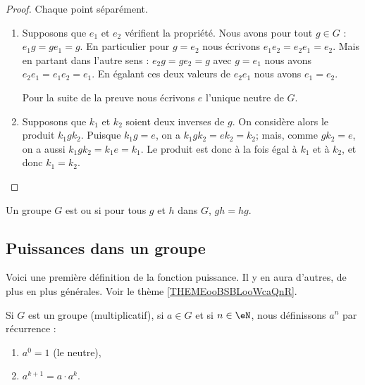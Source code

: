\begin{proof}
    Chaque point séparément.
    \begin{enumerate}
        \item
            Supposons que \( e_1\) et \( e_2\) vérifient la propriété. Nous avons pour tout \( g\in G\) : \( e_1g=ge_1=g\). En particulier pour \( g=e_2\) nous écrivons \( e_1e_2=e_2e_1=e_2\). Mais en partant dans l'autre sens : \( e_2g=ge_2=g\) avec \( g=e_1\) nous avons \( e_2e_1=e_1e_2=e_1\). En égalant ces deux valeurs de \( e_2e_1\) nous avons \( e_1=e_2\).

            Pour la suite de la preuve nous écrivons \( e\) l'unique neutre de \( G\).

        \item
            Supposons que \( k_1\) et \( k_2\) soient deux inverses de \( g\). On considère alors le produit \( k_1 g k_2 \). Puisque \(k_1 g = e \), on a \( k_1 g k_2 = e k_2 = k_2 \); mais, comme \(g k_2 = e \), on a aussi \( k_1 g k_2 = k_1 e = k_1 \). Le produit est donc à la fois égal à \( k_1 \) et à \( k_2 \), et donc \( k_1 = k_2 \).
    \end{enumerate}
\end{proof}

\begin{definition}\label{DEFGroupeAbelien}
    Un groupe \( G\) est  ou  si pour tous \( g\) et \( h\) dans \( G\), \( gh=hg\).
\end{definition}

\subsection{Puissances dans un groupe}

Voici une première définition de la fonction puissance. Il y en aura d'autres, de plus en plus générales. Voir le thème \ref{THEMEooBSBLooWcaQnR}.
\begin{definition}\label{DEFooGVSFooFVLtNo}
    Si \( G\) est un groupe (multiplicatif), si \( a\in G\) et si \( n\in \eN\), nous définissons \( a^n\) par récurrence :
    \begin{enumerate}
        \item
            \( a^0=1\) (le neutre),
        \item       \label{ITEMooOUIPooGjAgQb}
            \( a^{k+1}=a\cdot a^{k}\).
    \end{enumerate}
\end{definition}

